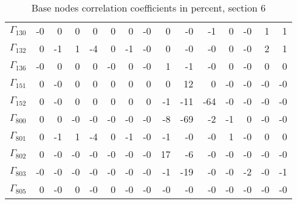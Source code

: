 {\begin{table}
\begin{center}
\begin{minipage}{\linewidth}
\begin{center}
\begin{envsmall}
\end{envsmall}
\ifhevea\else
\end{center}
\end{minipage}
\fi
\end{center}
\ifhevea\end{table}\fi
\ifhevea\begin{table}\fi%
\begin{center}
\ifhevea
\caption{Base nodes correlation coefficients in percent, section 6\label{tab:br-fit-corr6}}%
\else
\begin{minipage}{\linewidth}
\begin{center}
\label{tab:br-fit-corr6}%
\fi
\begin{envsmall}
\begin{center}
\renewcommand*{\arraystretch}{1.1}%
\begin{tabular}{rrrrrrrrrrrrrrr}
\hline
\( \Gamma_{130} \) &   -0 &    0 &    0 &    0 &    0 &    0 &   -0 &    0 &   -0 &   -1 &    0 &   -0 &    1 &    1 \\
\( \Gamma_{132} \) &    0 &   -1 &    1 &   -4 &    0 &   -1 &   -0 &    0 &   -0 &   -0 &    0 &   -0 &    2 &    1 \\
\( \Gamma_{136} \) &   -0 &    0 &    0 &    0 &   -0 &    0 &   -0 &    1 &   -1 &   -0 &    0 &   -0 &    0 &    0 \\
\( \Gamma_{151} \) &    0 &   -0 &    0 &    0 &    0 &    0 &    0 &    0 &   12 &    0 &   -0 &   -0 &   -0 &   -0 \\
\( \Gamma_{152} \) &    0 &   -0 &    0 &    0 &    0 &    0 &    0 &   -1 &  -11 &  -64 &   -0 &   -0 &   -0 &   -0 \\
\( \Gamma_{800} \) &    0 &    0 &   -0 &   -0 &   -0 &   -0 &   -0 &   -8 &  -69 &   -2 &   -1 &    0 &   -0 &   -0 \\
\( \Gamma_{801} \) &    0 &   -1 &    1 &   -4 &    0 &   -1 &   -0 &   -1 &   -0 &   -0 &    1 &   -0 &    0 &    0 \\
\( \Gamma_{802} \) &    0 &   -0 &   -0 &   -0 &   -0 &   -0 &   -0 &   17 &   -6 &   -0 &   -0 &   -0 &   -0 &   -0 \\
\( \Gamma_{803} \) &   -0 &   -0 &   -0 &   -0 &   -0 &   -0 &   -0 &   -1 &  -19 &   -0 &   -0 &   -2 &   -0 &   -1 \\
\( \Gamma_{805} \) &    0 &   -0 &    0 &   -0 &    0 &   -0 &   -0 &   -0 &   -0 &   -0 &   -0 &   -0 &   -0 &   -0 \\

\end{tabular}
\end{center}
\end{envsmall}
\end{center}
\end{minipage}
\end{center}
\end{table}}
